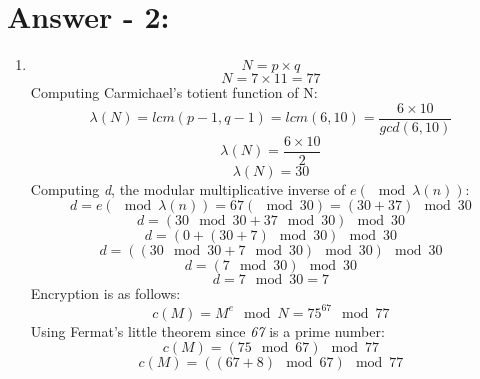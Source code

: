 \documentclass[10pt,a4paper,oneside]{article}
\begin{document}
\section*{Answer - 2:}
\begin{enumerate}
\item 
\begin{equation}
N = p \times q
\end{equation}
\begin{equation}
N = 7 \times 11 = 77
\end{equation}
Computing Carmichael's totient function of N:
\begin{equation}
\lambda (N) = lcm ( p -1, q - 1) = lcm ( 6, 10) = \frac{6 \times 10}{gcd (6, 10)}
\end{equation}
\begin{equation}
\lambda (N) = \frac{6 \times 10}{2}
\end{equation}
\begin{equation}
\lambda (N) = 30
\end{equation}
Computing \textit{d}, the modular multiplicative inverse of \( e (\mod \lambda(n)) \):
\begin{equation}
d = e (\mod \lambda(n)) = 67 (\mod 30) = (30 + 37) \mod 30
\end{equation}
\begin{equation}
d = (30 \mod 30 + 37 \mod 30 ) \mod 30
\end{equation}
\begin{equation}
d = (0+ (30 + 7) \mod 30 ) \mod 30
\end{equation}
\begin{equation}
d = ((30 \mod 30 + 7 \mod 30 ) \mod 30 ) \mod 30
\end{equation}
\begin{equation}
d = (7 \mod 30 ) \mod 30
\end{equation}
\begin{equation}
d = 7 \mod 30 = 7
\end{equation}
Encryption is as follows:
\begin{equation}
c(M) = M^e \mod N = 75 ^ {67} \mod 77 
\end{equation}
Using Fermat's little theorem since \textit{67} is a prime number:
\begin{equation}
c(M) = (75 \mod 67) \mod 77 
\end{equation}
\begin{equation}
c(M) = ( (67+ 8)\mod 67) \mod 77 
\end{equation}
\begin{equation}

\end{equation}
\end{enumerate}
\end{document}
